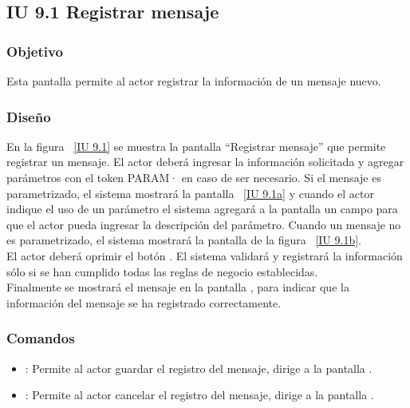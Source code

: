 \subsection{IU 9.1 Registrar mensaje}

\subsubsection{Objetivo}
	
	Esta pantalla permite al actor registrar la información de un mensaje nuevo.

\subsubsection{Diseño}

    En la figura ~\ref{IU 9.1} se muestra la pantalla ``Registrar mensaje'' que permite registrar un mensaje. El actor deberá ingresar la información solicitada 
    y agregar parámetros con el token PARAM· en caso de ser necesario. Si el mensaje es parametrizado, el sistema mostrará la pantalla ~\ref{IU 9.1a} y 
    cuando el actor indique el uso de un parámetro el sistema agregará a la pantalla un campo para que el actor pueda ingresar la descripción del parámetro. 
    Cuando un mensaje no es parametrizado, el sistema mostrará la pantalla de la figura ~\ref{IU 9.1b}.\\
    
    El actor deberá oprimir el botón . El sistema validará y registrará la información sólo si se han cumplido todas las reglas de negocio establecidas.  \\
    
    Finalmente se mostrará el mensaje  en la pantalla , para indicar que la información del mensaje
    se ha registrado correctamente.        



\subsubsection{Comandos}
\begin{itemize}
	\item {}: Permite al actor guardar el registro del mensaje, dirige a la pantalla .
	\item {}: Permite al actor cancelar el registro del mensaje, dirige a la pantalla .
\end{itemize}

